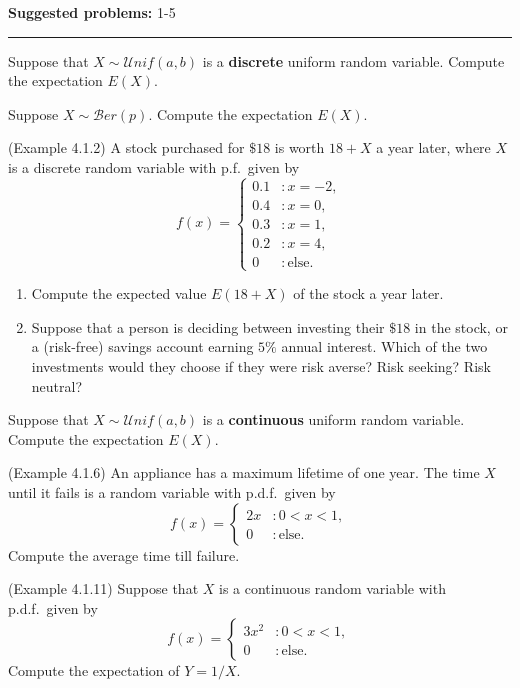 \documentclass[12pt,reqno]{amsart}
\begin{document}
\textbf{Suggested problems:} 1-5

\bigskip
\hrule

\bigskip
\prob Suppose that $X \sim \mathcal{U}nif(a,b)$ is a \textbf{discrete} uniform random variable. Compute the expectation $E(X)$.\vfill

\prob Suppose $X\sim \mathcal{B}er(p)$. Compute the expectation $E(X)$.

\vfill
\prob (Example 4.1.2) A stock purchased for $\$18$ is worth $18 + X$ a year later, where $X$ is a discrete random variable with p.f.\ given by
\[
	f(x) = \begin{cases}
	0.1 &: x=-2, \\
	0.4 &: x=0, \\
	0.3 &: x=1, \\
	0.2 &: x=4, \\
	0&: \text{else}.
	\end{cases}
\]

\begin{enumerate}
\item Compute the expected value $E(18+X)$ of the stock a year later.\vfill
\item Suppose that a person is deciding between investing their $\$18$ in the stock, or a (risk-free) savings account earning $5\%$ annual interest. Which of the two investments would they choose if they were risk averse? Risk seeking? Risk neutral?
\end{enumerate}

\vfill
\newpage
\prob Suppose that $X \sim \mathcal{U}nif(a,b)$ is a \textbf{continuous} uniform random variable. Compute the expectation $E(X)$.

\vfill
\prob (Example 4.1.6) An appliance has a maximum lifetime of one year. The time $X$ until it fails is a random variable with p.d.f.\ given by
\[
	f(x) = \begin{cases}
	2x & : 0 < x < 1, \\
	0 & : \text{else}.
	\end{cases}
\]
Compute the average time till failure.

\vfill
\prob (Example 4.1.11) Suppose that $X$ is a continuous random variable with p.d.f.\ given by
\[
	f(x) = \begin{cases}
	3x^2 & : 0 < x < 1, \\
	0 & : \text{else}.
	\end{cases}
\]
Compute the expectation of $Y = 1/X$.

\vfill
\end{document}
